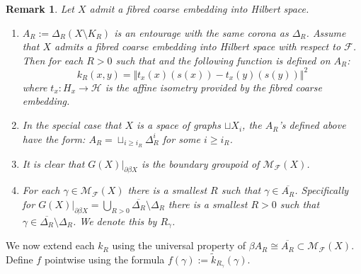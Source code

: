 \documentclass[preprint]{elsarticle}
\theoremstyle{plain}
\newtheorem{rem}[theorem]{Remark}
\theoremstyle{definition}%
\theoremstyle{remark}%
\begin{document}
\begin{rem}\label{rem:outline}
Let $X$ admit a fibred coarse embedding into Hilbert space.
\begin{enumerate}
\item $A_{R}:=\Delta_{R}(X\setminus K_{R})$ is an entourage with the same corona as $\Delta_{R}$. Assume that $X$ admits a fibred coarse embedding into Hilbert space with respect to $\mathcal{F}$. Then for each $R>0$ such that and the following function is defined on $A_{R}$:
\begin{equation*}
k_{R}(x,y)=\Vert t_{x}(x)(s(x))-t_{x}(y)(s(y))\Vert^{2}
\end{equation*}
where $t_{x}:H_{x} \rightarrow \mathcal{H}$ is the affine isometry provided by the fibred coarse embedding.
\item In the special case that $X$ is a space of graphs $\sqcup X_{i}$, the $A_{R}$'s defined above have the form: $A_{R}= \sqcup_{i\geq i_{R}}\Delta_{R}^{i}$ for some $i\geq i_{R}$.
\item It is clear that $G(X)|_{\partial\beta X}$ is the boundary groupoid of $\mathcal{M}_{\mathcal{F}}(X)$.
\item For each $\gamma \in \mathcal{M}_{\mathcal{F}}(X)$ there is a smallest $R$ such that $\gamma \in \overline{A_{R}}$. Specifically for $G(X)|_{\partial\beta X} = \bigcup_{R>0} \overline{\Delta_{R}}\setminus \Delta_{R}$ there is a smallest $R>0$ such that $\gamma \in \overline{\Delta_{R}}\setminus \Delta_{R}$. We denote this by $R_{\gamma}$.
\end{enumerate}
\end{rem}

We now extend each $k_{R}$ using the universal property of $\beta A_{R} \cong \overline{A_{R}} \subset \mathcal{M}_{\mathcal{F}}(X)$. Define $f$ pointwise using the formula $f(\gamma):= \tilde{k}_{R_{\gamma}}(\gamma)$.
\end{document}
